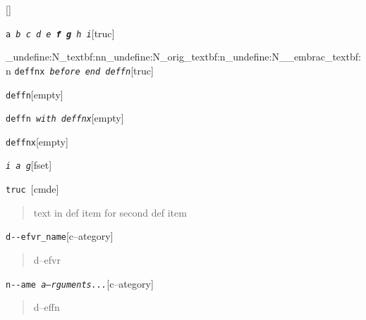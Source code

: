 \documentclass{book}
\begin{document}
%
\noindent\texttt{}\hfill[]



\noindent\texttt{a \EmbracOn{}\textnormal{\textsl{b c d e \textbf{f g} h i}}\EmbracOff{}}\hfill[truc]


\ExplSyntaxOn%
\cs_undefine:N{\embrac_textbf:nn}\cs_undefine:N{\embrac_orig_textbf:n}\cs_undefine:N{\__embrac_textbf:n}%
\ExplSyntaxOff%
%
\noindent\texttt{deffnx \EmbracOn{}\textnormal{\textsl{before end deffn}}\EmbracOff{}}\hfill[truc]



%


\noindent\texttt{deffn}\hfill[empty]



%

\noindent\texttt{deffn \EmbracOn{}\textnormal{\textsl{with deffnx}}\EmbracOff{}}\hfill[empty]



%
\noindent\texttt{deffnx}\hfill[empty]



%

\noindent\texttt{\textsl{i} \EmbracOn{}\textnormal{\textsl{a g}}\EmbracOff{}}\hfill[fset]



%
\noindent\texttt{truc \EmbracOn{}\textnormal{\textsl{}}\EmbracOff{}}\hfill[cmde]



%
\begin{quote}
\unskip{\parskip=0pt\noindent}%
text in def item for second def item
\end{quote}


\noindent\texttt{d{-}{-}efvr\_name}\hfill[c--ategory]



%
\begin{quote}
\unskip{\parskip=0pt\noindent}%
d--efvr
\end{quote}

\noindent\texttt{n{-}{-}ame \EmbracOn{}\textnormal{\textsl{a--rguments...}}\EmbracOff{}}\hfill[c--ategory]



%
\begin{quote}
\unskip{\parskip=0pt\noindent}%
d--effn
\end{quote}
\end{document}

